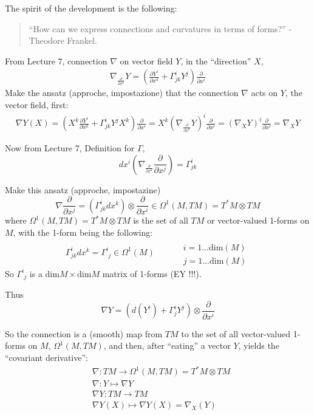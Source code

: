 \documentclass[10pt, twoside]{amsart}
\begin{document}
\begin{multicols*}{2}
The spirit of the development is the following:
\begin{quote}
``How can we express connections and curvatures in terms of forms?'' -Theodore Frankel.  
\end{quote}

From Lecture 7, connection $\nabla$ on vector field $Y$, in the ``direction'' $X$,
\[
\begin{gathered}
  \nabla_{ \frac{ \partial }{ \partial x^k } } Y = \left( \frac{ \partial Y^i }{ \partial x^k } + \Gamma^i_{jk} Y^j  \right) \frac{ \partial }{ \partial x^i }
\end{gathered}
\]
Make the ansatz (approche, impostazione) that the connection $\nabla$ acts on $Y$, the vector field, first:
\[
\begin{gathered}
  \nabla Y(X) = \left( X^k \frac{ \partial Y^i}{ \partial x^k} + \Gamma^i_{jk} Y^j X^k \right) \frac{ \partial}{ \partial x^i } = X^k \left( \nabla_{ \frac{ \partial }{ \partial x^k} } Y \right)^i \frac{ \partial }{ \partial x^i} = (\nabla_X Y)^i \frac{ \partial}{ \partial x^i} = \nabla_XY
\end{gathered}
\]

Now from Lecture 7, Definition for $\Gamma$, 
\[
dx^i \left( \nabla_{ \frac{  \partial }{ \partial x^k } } \frac{ \partial }{ \partial x^j } \right) = \Gamma^i_{jk}
\]

Make this ansatz (approche, impostazine)
\[
\nabla \frac{ \partial}{ \partial x^j } = \left( \Gamma^i_{jk} dx^k \right) \otimes \frac{ \partial }{ \partial x^i} \in \Omega^1(M,TM) = T^*M \otimes TM
\]
where $\Omega^1(M,TM) = T^*M \otimes TM$ is the set of all $TM$ or vector-valued 1-forms on $M$, with the 1-form being the following:
\[
\Gamma^i_{jk} dx^k = \Gamma^i_{ \, \, j } \in \Omega^1(M) \quad \quad \, \begin{aligned}
  & \quad \\
  & i = 1 \dots \text{dim}(M) \\ 
  & j = 1\dots \text{dim}(M) \end{aligned}
\]
So $\Gamma^i_{ \, \, j}$ is a $\text{dim}M \times \text{dim}M$ matrix of 1-forms (EY !!!). 

Thus
\[
\nabla Y = (d(Y^i) + \Gamma^i_j Y^j ) \otimes \frac{ \partial }{ \partial x^i}
\]

So the connection is a (smooth) map from $TM$ to the set of all vector-valued 1-forms on $M$, $\Omega^1(M,TM)$, and then, after ``eating'' a vector $Y$, yields the ``covariant derivative'':
\[
\begin{aligned}
  & \nabla: TM \to \Omega^1(M,TM) = T^*M \otimes TM \\ 
  & \nabla : Y \mapsto \nabla Y \\ 
  & \nabla Y : TM \to TM \\
  & \nabla Y(X) \mapsto \nabla Y(X) = \nabla_X(Y)
\end{aligned}
\]


\end{multicols*}
\end{document}
